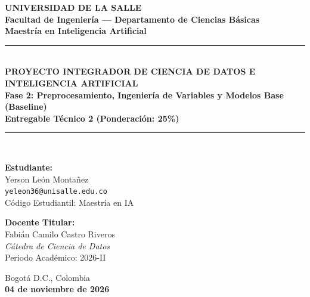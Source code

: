 \documentclass[11pt,letterpaper]{article}
\begin{document}
\begin{titlepage}
    \centering
    \vspace*{0.5cm}
    {\huge \textbf{\textcolor{lasalleblue}{UNIVERSIDAD DE LA SALLE}}}\\[0.3cm]
    {\large \textbf{Facultad de Ingeniería — Departamento de Ciencias Básicas}}\\[0.2cm]
    {\large \textbf{Maestría en Inteligencia Artificial}}\\[1.8cm]

    \rule{\linewidth}{1.5pt}\\[0.4cm]
    {\LARGE \textbf{\textcolor{lasalleblue}{PROYECTO INTEGRADOR DE CIENCIA DE DATOS E INTELIGENCIA ARTIFICIAL}}}\\[0.3cm]
    {\Large \textbf{Fase 2: Preprocesamiento, Ingeniería de Variables y Modelos Base (Baseline)}}\\[0.2cm]
    {\normalsize \textbf{Entregable Técnico 2 (Ponderación: 25\%)}}\\[0.4cm]
    \rule{\linewidth}{1.5pt}\\[2.0cm]

    \begin{minipage}[t]{0.48\textwidth}
        \textbf{Estudiante:}\\
        Yerson León Montañez\\
        \texttt{yeleon36@unisalle.edu.co}\\
        Código Estudiantil: Maestría en IA
    \end{minipage}
    \hfill
    \begin{minipage}[t]{0.48\textwidth}
        \begin{flushright}
            \textbf{Docente Titular:}\\
            Fabián Camilo Castro Riveros\\
            \textit{Cátedra de Ciencia de Datos}\\
            Periodo Académico: 2026-II
        \end{flushright}
    \end{minipage}

    \vfill
    {\large Bogotá D.C., Colombia\\ \textbf{04 de noviembre de 2026}}
\end{titlepage}

\newpage
\tableofcontents
\newpage

\end{document}
